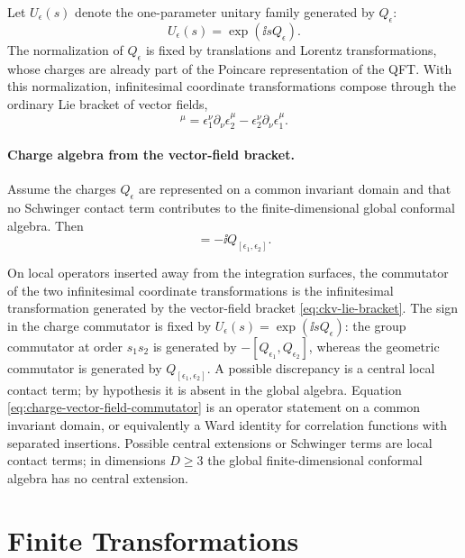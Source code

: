 \begin{convention}
\label{conv:conformal-charge-sign}
Let \(U_\epsilon(s)\) denote the one-parameter unitary family generated by
\(Q_\epsilon\):
\[
  U_\epsilon(s)=\exp(\ii s Q_\epsilon).
\]
The normalization of \(Q_\epsilon\) is fixed by translations and Lorentz
transformations, whose charges are already part of the Poincare
representation of the QFT.  With this normalization, infinitesimal coordinate
transformations compose through the ordinary Lie bracket of vector fields,
\begin{equation}
  [\epsilon_1,\epsilon_2]^\mu
  =
  \epsilon_1^\nu\partial_\nu\epsilon_2^\mu
  -
  \epsilon_2^\nu\partial_\nu\epsilon_1^\mu .
  \label{eq:ckv-lie-bracket}
\end{equation}
\end{convention}

\paragraph{Charge algebra from the vector-field bracket.}
Assume the charges \(Q_{\epsilon}\) are represented on a common invariant
domain and that no Schwinger contact term contributes to the finite-dimensional
global conformal algebra.  Then
\begin{equation}
  [Q_{\epsilon_1},Q_{\epsilon_2}]
  =
  -\ii Q_{[\epsilon_1,\epsilon_2]} .
  \label{eq:charge-vector-field-commutator}
\end{equation}

On local operators inserted away from the integration surfaces, the commutator
of the two infinitesimal coordinate transformations is the infinitesimal
transformation generated by the vector-field bracket
\eqref{eq:ckv-lie-bracket}.  The sign in the charge commutator is fixed by
\(U_\epsilon(s)=\exp(\ii sQ_\epsilon)\): the group commutator at order
\(s_1s_2\) is generated by \(-[Q_{\epsilon_1},Q_{\epsilon_2}]\), whereas the
geometric commutator is generated by \(Q_{[\epsilon_1,\epsilon_2]}\).  A
possible discrepancy is a central local contact term; by hypothesis it is
absent in the global algebra.
Equation \eqref{eq:charge-vector-field-commutator} is an operator statement on
a common invariant domain, or equivalently a Ward identity for correlation
functions with separated insertions.  Possible central extensions or
Schwinger terms are local contact terms; in dimensions \(D\ge3\) the global
finite-dimensional conformal algebra has no central extension.

\section{Finite Transformations}

